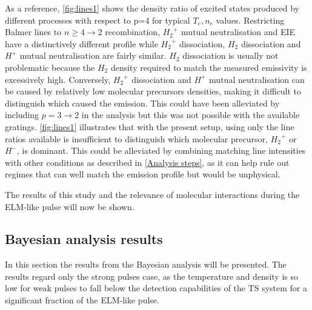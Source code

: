 As a reference, \autoref{fig:lines1} shows the density ratio of excited states produced by different processes with respect to p=4 for typical $T_e,n_e$ values. %
Restricting Balmer lines to $n \geq 4 \rightarrow 2$ recombination, ${H_2}^+$ mutual neutralisation and EIE have a distinctively different profile while ${H_2}^+$ dissociation, $H_2$ dissociation and $H^+$ mutual neutralisation are fairly similar. $H_2$ dissociation is usually not problematic because the $H_2$ density required to match the measured emissivity is excessively high. Conversely, ${H_2}^+$ dissociation and $H^+$ mutual neutralisation can be caused by relatively low molecular precursors densities, making it difficult to distinguish which caused the emission. This could have been alleviated by including $p=3 \rightarrow 2$ in the analysis\cite{Verhaegh2021a} but this was not possible with the available gratings. \autoref{fig:lines1} illustrates that with the present setup, using only the line ratios available is insufficient to distinguish which molecular precursor, ${H_2}^+$ or $H^-$, is dominant. This could be alleviated by combining matching line intensities with other conditions as described in \autoref{Analysis steps}, as it can help rule out regimes that can well match the emission profile but would be unphysical.

The results of this study and the relevance of molecular interactions during the ELM-like pulse will now be shown.

\subsection{Bayesian analysis results}\label{Bayesian analysis results}
In this section the results from the Bayesian analysis will be presented. The results regard only the strong pulses case, as the temperature and density is so low for weak pulses to fall below the detection capabilities of the TS system for a significant fraction of the ELM-like pulse.

